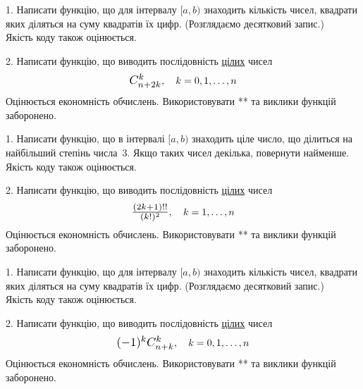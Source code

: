 \documentclass[12pt, ukrainian]{article}
\begin{document}



\begin {Large}
1. Написати функцію, що для інтервалу $[a, b)$ знаходить кількість чисел, квадрати яких діляться на суму квадратів їх цифр. (Розглядаємо десятковий запис.)\\	Якість коду також оцінюється. 



\vspace{10mm}

\newpage

2. 
Написати функцію, що виводить послідовність \underline{цілих} чисел
$$\scalebox{1.2}{$C_{n+2k}^{k}$}, \quad k=0,1,\ldots,n$$
Оцінюється економність обчислень. Використовувати ** та виклики функцій заборонено.

\end {Large}\newpage




\begin {Large}
1. Написати функцію, що в інтервалі $[a, b)$ знаходить ціле число, що ділиться на найбільший степінь числа 3. Якщо таких чисел декілька, повернути найменше.\\	Якість коду також оцінюється. 



\vspace{10mm}

\newpage

2. 
Написати функцію, що виводить послідовність \underline{цілих} чисел
$$\scalebox{1.2}{$\frac{(2k+1)!!}{(k!)^2}$}, \quad k=1,\ldots,n$$
Оцінюється економність обчислень. Використовувати ** та виклики функцій заборонено.

\end {Large}\newpage




\begin {Large}
1. Написати функцію, що для інтервалу $[a, b)$ знаходить кількість чисел, квадрати яких діляться на суму квадратів їх цифр. (Розглядаємо десятковий запис.)\\	Якість коду також оцінюється. 



\vspace{10mm}

\newpage

2. 
Написати функцію, що виводить послідовність \underline{цілих} чисел
$$\scalebox{1.2}{$(-1)^{k}C_{n+k}^{k}$}, \quad k=0,1,\ldots,n$$
Оцінюється економність обчислень. Використовувати ** та виклики функцій заборонено.

\end {Large}\newpage
\end{document}

